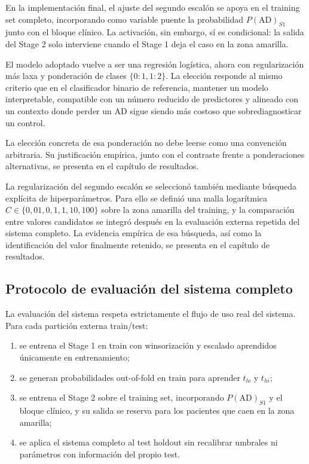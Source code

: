 En la implementación final, el ajuste del segundo escalón se apoya en el training set completo, incorporando como
variable puente la probabilidad $P(\text{AD})_{S1}$ junto con el bloque clínico. La activación, sin embargo, sí es
condicional: la salida del Stage 2 solo interviene cuando el Stage 1 deja el caso en la zona amarilla.

El modelo adoptado vuelve a ser una regresión logística, ahora con regularización más laxa y ponderación de clases
$\{0:1,1:2\}$. La elección responde al mismo criterio que en el clasificador binario de referencia, mantener un modelo
interpretable, compatible con un número reducido de predictores y alineado con un contexto donde perder un AD sigue
siendo más costoso que sobrediagnosticar un control.

La elección concreta de esa ponderación no debe leerse como una convención arbitraria. Su justificación empírica, junto
con el contraste frente a ponderaciones alternativas, se presenta en el capítulo de resultados.

La regularización del segundo escalón se seleccionó también mediante búsqueda explícita de hiperparámetros. Para ello se
definió una malla logarítmica $C \in \{0{,}01, 0{,}1, 1, 10, 100\}$ sobre la zona amarilla del training, y la comparación
entre valores candidatos se integró después en la evaluación externa repetida del sistema completo. La evidencia empírica
de esa búsqueda, así como la identificación del valor finalmente retenido, se presenta en el capítulo de resultados.

\subsection{Protocolo de evaluación del sistema completo}

La evaluación del sistema respeta estrictamente el flujo de uso real del sistema. Para cada partición externa
train/test:

\begin{enumerate}
    \item se entrena el Stage 1 en train con winsorización y escalado aprendidos únicamente en entrenamiento;
    \item se generan probabilidades out-of-fold en train para aprender $t_{lo}$ y $t_{hi}$;
    \item se entrena el Stage 2 sobre el training set, incorporando $P(\text{AD})_{S1}$ y el bloque clínico, y su salida se reserva para los pacientes que caen en la zona amarilla;
    \item se aplica el sistema completo al test holdout sin recalibrar umbrales ni parámetros con información del propio test.
\end{enumerate}


